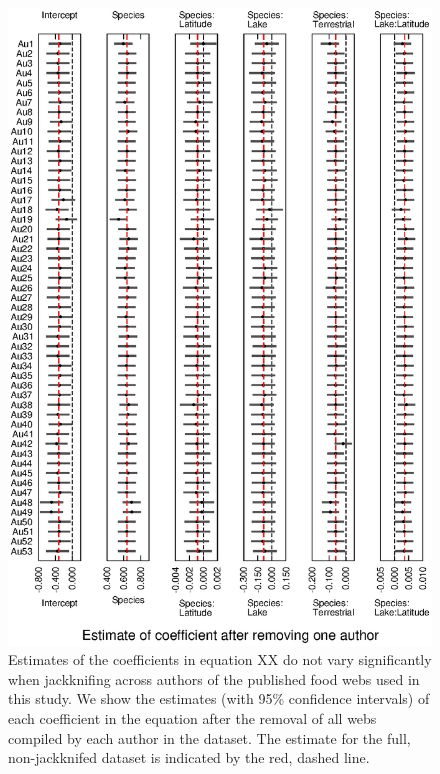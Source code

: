 \documentclass[12pt]{article}
\begin{document}
    \begin{figure}[h]
    \centerline{\includegraphics*[width=.8\textwidth]{Figures/Jackknife/LS_author.eps}}
    \caption{Estimates of the coefficients in equation XX do not vary significantly
    when jackknifing across authors of the published food webs used in this study. 
    We show the estimates (with 95\% confidence intervals) of each coefficient
    in the equation after the removal of all webs compiled by each author in the dataset.
    The estimate for the full, non-jackknifed dataset is indicated by the red, dashed line.}
    \label{LS_web}
    \end{figure}
\end{document}
